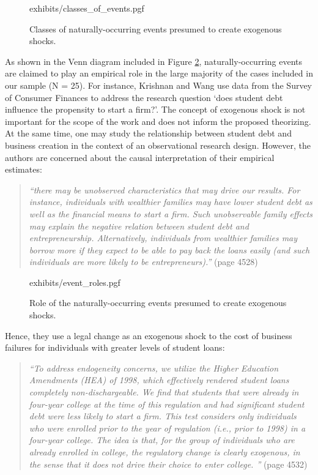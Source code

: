 \begin{refsection}
\begin{figure}[!htbp]
    \centering
    {exhibits/classes_of_events.pgf}
    \caption{Classes of naturally-occurring events presumed to create 
    exogenous shocks.}
    \label{fig:classes_of_events}
\end{figure}

As shown in the Venn diagram included in Figure \ref{fig:event_roles},
naturally-occurring events are claimed to play an empirical role in the large majority
of the cases included in our sample (N = 25). For instance, Krishnan and 
Wang \parencite*{krishnan20194522} use data from the Survey of Consumer 
Finances to address the research question
`does student debt influence the propensity to start a firm?'. The concept 
of exogenous shock is not important for the scope of the work 
and does not inform the proposed theorizing. At the same time, one may study
the relationship between student debt and business creation in the context of 
an observational research design. However, the authors are concerned about 
the causal interpretation of their empirical estimates:

\begin{quote}
  \textit{
  ``there may be unobserved characteristics that may drive our results. For
  instance, individuals with wealthier families may have lower student debt as
  well as the financial means to start a firm. Such unobservable family effects
  may explain the negative relation between student debt and entrepreneurship.
  Alternatively, individuals from wealthier families may borrow more if they
  expect to be able to pay back the loans easily (and such individuals are more
  likely to be entrepreneurs).''
  }
  (page 4528)
\end{quote}

\begin{figure}[!htbp]
    \centering
    {exhibits/event_roles.pgf}
    \caption{Role of the naturally-occurring events presumed to create exogenous shocks.}
    \label{fig:event_roles}
\end{figure}

Hence, they use a legal change as an exogenous shock to the cost of business 
failures for individuals with greater levels of student loans:

\begin{quote}
  \textit{
  ``To address endogeneity concerns, we utilize the Higher Education Amendments
  (HEA) of 1998, which effectively rendered student loans completely
  non-dischargeable. We find that students that were already in four-year college
  at the time of this regulation and had significant student debt were less
  likely to start a firm. This test considers only individuals who were enrolled
  prior to the year of regulation (i.e., prior to 1998) in a four-year college.
  The idea is that, for the group of individuals who are already enrolled in
  college, the regulatory change is clearly exogenous, in the sense that it
  does not drive their choice to enter college. ''
  }
  (page 4532)
\end{quote}


\end{refsection}
